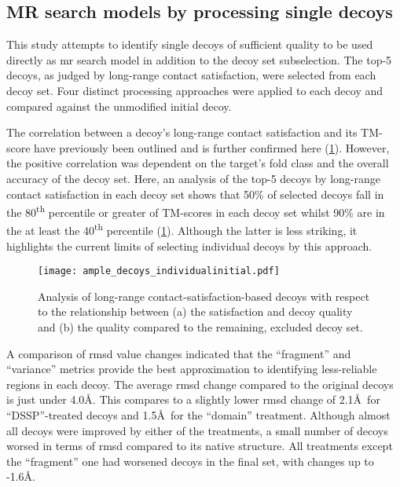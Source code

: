 \subsection{MR search models by processing single decoys}
This study attempts to identify single decoys of sufficient quality to be used directly as \gls{mr} search model in addition to the decoy set subselection. The top-5 decoys, as judged by long-range contact satisfaction, were selected from each decoy set. Four distinct processing approaches were applied to each decoy and compared against the unmodified initial decoy.

The correlation between a decoy's long-range contact satisfaction and its TM-score have previously been outlined and is further confirmed here (\cref{fig:ample_decoys_individualinitial}). However, the positive correlation was dependent on the target's fold class and the overall accuracy of the decoy set. Here, an analysis of the top-5 decoys by long-range contact satisfaction in each decoy set shows that 50\% of selected decoys fall in the 80\textsuperscript{th} percentile or greater of TM-scores in each decoy set whilst 90\% are in the at least the 40\textsuperscript{th} percentile (\cref{fig:ample_decoys_individualinitial}). Although the latter is less striking, it highlights the current limits of selecting individual decoys by this approach.

\begin{figure}[H]
	\centering
	\texttt{[image: ample\_decoys\_individualinitial.pdf]}
        \caption[Selection of single decoys by long-range satisfaction]{Analysis of long-range contact-satisfaction-based decoys with respect to the relationship between (a) the satisfaction and decoy quality and (b) the quality compared to the remaining, excluded decoy set.}
	\label{fig:ample_decoys_individualinitial}
\end{figure}

A comparison of \gls{rmsd} value changes indicated that the ``fragment'' and ``variance'' metrics provide the best approximation to identifying less-reliable regions in each decoy. The average \gls{rmsd} change compared to the original decoys is just under 4.0\AA. This compares to a slightly lower \gls{rmsd} change of 2.1\AA\ for ``DSSP''-treated decoys and 1.5\AA\ for the ``domain'' treatment. Although almost all decoys were improved by either of the treatments, a small number of decoys worsed in terms of \gls{rmsd} compared to its native structure. All treatments except the ``fragment'' one had worsened decoys in the final set, with changes up to -1.6\AA. 

